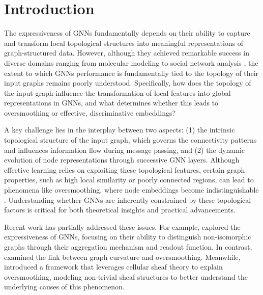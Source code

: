 \section{Introduction}
\label{introduction}


The expressiveness of GNNs fundamentally depends on their ability to capture and transform local topological structures into meaningful representations of graph-structured data. However, although they achieved remarkable success in diverse domains ranging from molecular modeling \cite{gilmer2017neuralmessagepassingquantum} to social network analysis \cite{hamilton2018inductiverepresentationlearninglarge}, the extent to which GNNs performance is fundamentally tied to the topology of their input graphs remains poorly understood. Specifically, how does the topology of the input graph influence the transformation of local features into global representations in GNNs, and what determines whether this leads to oversmoothing \cite{chen2019measuringrelievingoversmoothingproblem} or effective, discriminative embeddings?

A key challenge lies in the interplay between two aspects: (1) the intrinsic topological structure of the input graph, which governs the connectivity patterns and influences information flow during message passing, and (2) the dynamic evolution of node representations through successive GNN layers. Although effective learning relies on exploiting these topological features, certain graph properties, such as high local similarity or poorly connected regions, can lead to phenomena like oversmoothing, where node embeddings become indistinguishable \cite{chen2019measuringrelievingoversmoothingproblem}. Understanding whether GNNs are inherently constrained by these topological factors is critical for both theoretical insights and practical advancements.



Recent work has partially addressed these issues. For example, \citet{xu2019powerfulgraphneuralnetworks} explored the expressiveness of GNNs, focusing on their ability to distinguish non-isomorphic graphs through their aggregation mechanism and readout function. In contrast, \citet{nguyen2023revisitingoversmoothingoversquashingusing} examined the link between graph curvature and oversmoothing. Meanwhile, \citet{bodnar2023neuralsheafdiffusiontopological} introduced a framework that leverages cellular sheaf theory to explain oversmoothing, modeling non-trivial sheaf structures to better understand the underlying causes of this phenomenon. 

